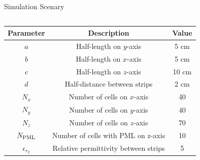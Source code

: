 \documentclass{beamer}
\begin{document}
\begin{frame}{Simulation Scenary}
    \begin{center}
      \resizebox{0.8\textwidth}{!}
      { 
        
        
      }
    \end{center}
      \begin{columns}
        
        \begin{column}{0.45\textwidth}
          \begin{table}[H]
          \resizebox{\textwidth}{!}
          {
            \begin{tabular}{|c|c|c|}
            \hline
            \textbf{Parameter} & \textbf{Description}               & \textbf{Value} \\ \hline
            $a$                & Half-length on $y$-axis              & 5 cm           \\ \hline
            $b$                & Half-length on $x$-axis              & 5 cm           \\ \hline
            $c$                & Half-length on $z$-axis              & 10 cm          \\ \hline
            $d$                & Half-distance between strips       & 2 cm           \\ \hline
            $N_x$              & Number of cells on $x$-axis          & 40             \\ \hline
            $N_y$              & Number of cells on $y$-axis          & 40             \\ \hline
            $N_z$              & Number of cells on $z$-axis          & 70             \\ \hline
            $N_{\textnormal{PML}}$          & Number of cells with PML on z-axis & 10             \\ \hline
            $\epsilon_{r_2}$          & Relative permittivity between strips & 5             \\ \hline
            \end{tabular}
          }
          \end{table}
          
        \end{column}


\end{columns}
\end{frame}
\end{document}
